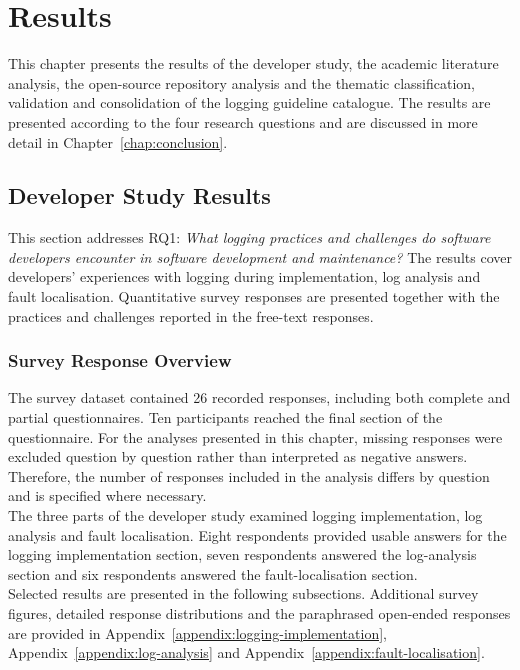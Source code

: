 \chapter{Results} \label{chap:results}

This chapter presents the results of the developer study, the academic literature
analysis, the open-source repository analysis and the thematic classification,
validation and consolidation of the logging guideline catalogue. The results are presented according
to the four research questions and are discussed in more detail in
Chapter~\ref{chap:conclusion}.

\section{Developer Study Results}
This section addresses RQ1: \textit{What logging practices and challenges do
software developers encounter in software development and maintenance?}
The results cover developers' experiences with logging during implementation,
log analysis and fault localisation. Quantitative survey responses are presented
together with the practices and challenges reported in the free-text responses.

\subsection{Survey Response Overview}

The survey dataset contained 26 recorded responses, including both complete and
partial questionnaires. Ten participants reached the final section of the
questionnaire. For the analyses presented in this chapter, missing responses were
excluded question by question rather than interpreted as negative answers.
Therefore, the number of responses included in the analysis differs by question
and is specified where necessary.
\\
The three parts of the developer study examined logging implementation, log analysis
and fault localisation. Eight respondents provided usable answers for the logging
implementation section, seven respondents answered the log-analysis section and six
respondents answered the fault-localisation section.
\\
Selected results are presented in the following subsections. Additional survey
figures, detailed response distributions and the paraphrased open-ended responses
are provided in Appendix~\ref{appendix:logging-implementation},
Appendix~\ref{appendix:log-analysis} and
Appendix~\ref{appendix:fault-localisation}.


